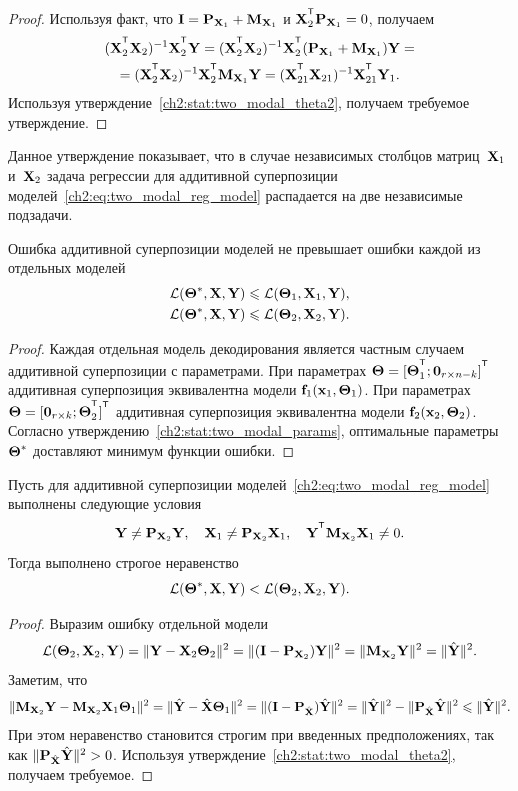 \begin{proof}
	Используя факт, что $\mathbf{I} = \mathbf{P}_{\mathbf{X}_1} + \mathbf{M}_{\mathbf{X}_1}$ и $\bX_2^{\T} \bP_{\bX_1} = 0$, получаем
	\begin{multline*}
		(\bX_2^{\T} \bX_2)^{-1} \bX_2^{\T} \bY = (\bX_2^{\T} \bX_2)^{-1} \bX_2^{\T} (\bP_{\bX_1} + \bM_{\bX_1}) \bY = \\ = (\bX_2^{\T} \bX_2)^{-1} \bX_2^{\T} \bM_{\bX_1} \bY  = (\bX_{21}^{\T} \bX_{21})^{-1} \bX_{21}^{\T} \bY_1.
	\end{multline*}
	Используя утверждение~\ref{ch2:stat:two_modal_theta2}, получаем требуемое утверждение.
\end{proof}
Данное утверждение показывает, что в случае независимых столбцов матриц~$\mathbf{X}_1$ и~$\mathbf{X}_2$ задача регрессии для аддитивной суперпозиции моделей~\eqref{ch2:eq:two_modal_reg_model} распадается на две независимые подзадачи.

\begin{statement}
	Ошибка аддитивной суперпозиции моделей не превышает ошибки каждой из отдельных моделей
	\begin{align*}
		\mathcal{L}(\boldsymbol{\Theta}^*, \mathbf{X}, \mathbf{Y}) &\leqslant \mathcal{L}(\boldsymbol{\Theta}_1, \mathbf{X}_1, \mathbf{Y}), \\
		\mathcal{L}(\boldsymbol{\Theta}^*, \mathbf{X}, \mathbf{Y}) &\leqslant \mathcal{L}(\boldsymbol{\Theta}_2, \mathbf{X}_2, \mathbf{Y}).
	\end{align*}
\end{statement}
\begin{proof}
	Каждая отдельная модель декодирования является частным случаем аддитивной суперпозиции с параметрами. 
	При параметрах $\bTheta = [\bTheta_1^{\T}; \bZero_{r \times n - k}]^{\T}$ аддитивная суперпозиция эквивалентна модели $\mathbf{f}_1(\mathbf{x}_1, \boldsymbol{\Theta}_1)$.
	При параметрах $\bTheta = [\bZero_{r \times k}; \bTheta_2^{\T}]^{\T}$ аддитивная суперпозиция эквивалентна модели $\mathbf{f}_2(\mathbf{x}_2, \boldsymbol{\Theta}_2)$.
	Согласно утверждению~\ref{ch2:stat:two_modal_params}, оптимальные параметры $\boldsymbol{\Theta}^*$ доставляют минимум функции ошибки.
\end{proof}

\begin{statement}
	\label{ch2:stat:strict:two_model}
	Пусть для аддитивной суперпозиции моделей~\eqref{ch2:eq:two_modal_reg_model} выполнены следующие условия
	\[
		\bY \neq \bP_{\bX_2} \bY, \quad \bX_1 \neq \bP_{\bX_2} \bX_1, \quad \bY^{\T} \bM_{\bX_2} \bX_1 \neq 0.
	\]
	Тогда выполнено строгое неравенство
	\[
		\mathcal{L}(\boldsymbol{\Theta}^*, \mathbf{X}, \mathbf{Y}) < \mathcal{L}(\boldsymbol{\Theta}_2, \mathbf{X}_2, \mathbf{Y}).
	\]
\end{statement}
\begin{proof}
	Выразим ошибку отдельной модели
	\[
		\mathcal{L}(\boldsymbol{\Theta}_2, \mathbf{X}_2, \mathbf{Y}) = \| \mathbf{Y} - \mathbf{X}_2 \boldsymbol{\Theta}_2 \|^2 = \| (\mathbf{I} - \mathbf{P}_{\mathbf{X}_2}) \mathbf{Y} \|^2 = \| \mathbf{M}_{\mathbf{X}_2} \mathbf{Y} \|^2 = \| \hat{\mathbf{Y}} \|^2.
	\]	
	Заметим, что 
	\[
		\| \mathbf{M}_{\mathbf{X}_2} \mathbf{Y} - \mathbf{M}_{\mathbf{X}_2} \mathbf{X}_1 \boldsymbol{\Theta}_1 \|^2 = \| \hat{\mathbf{Y}} - \hat{\mathbf{X}} \boldsymbol{\Theta}_1 \|^2 = \| (\mathbf{I} - \mathbf{P}_{\hat{\mathbf{X}}}) \hat{\mathbf{Y}} \|^2 = \| \hat{\mathbf{Y}} \|^2 - \| \mathbf{P}_{\hat{\mathbf{X}}} \hat{\mathbf{Y}} \|^2 \leqslant \| \hat{\mathbf{Y}} \|^2.
	\]
	При этом неравенство становится строгим при введенных предположениях, так как $\| \mathbf{P}_{\hat{\mathbf{X}}} \hat{\mathbf{Y}} \|^2 > 0$.
	Используя утверждение~\ref{ch2:stat:two_modal_theta2}, получаем требуемое.
\end{proof}

